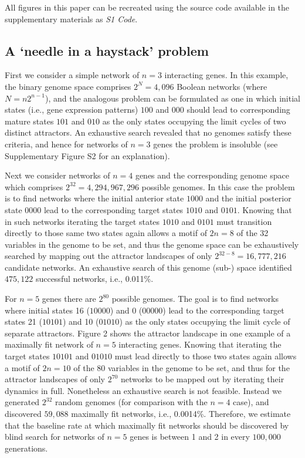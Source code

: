 \documentclass[10pt,letterpaper]{article}
\begin{document}
All figures in this paper can be recreated using the source code available in the supplementary materials as \emph{S1 Code}.

\subsection*{A `needle in a haystack' problem}

First we consider a simple network of $n=3$ interacting genes. In this example, the binary genome space comprises $2^N=4,096$ Boolean networks (where $N=n2^{n-1}$), and the analogous problem can be formulated as one in which initial states (i.e., gene expression patterns) $100$ and $000$ should lead to corresponding mature states $101$ and $010$ as the only states occupying the limit cycles of two distinct attractors. An exhaustive search revealed that no genomes satisfy these criteria, and hence for networks of $n=3$ genes the problem is insoluble (see Supplementary Figure S2 for an explanation).

Next we consider networks of $n=4$ genes and the corresponding genome space which comprises $2^{32}=4,294,967,296$ possible genomes. In this case the problem is to find networks where the initial anterior state $1000$ and the initial posterior state $0000$ lead to the corresponding target states $1010$ and $0101$. Knowing that in such networks iterating the target states $1010$ and $0101$ must transition directly to those same two states again allows a motif of $2n=8$ of the 32 variables in the genome to be set, and thus the genome space can be exhaustively searched by mapping out the attractor landscapes of only $2^{32-8}=16,777,216$ candidate networks. An exhaustive search of this genome (sub-) space identified $475,122$ successful networks, i.e., 0.011\%. 

For $n=5$ genes there are $2^{80}$ possible genomes. The goal is to find networks where initial states 16 ($10000$) and 0 ($00000$) lead to the corresponding target states 21 ($10101$) and 10 ($01010$) as the only states occupying the limit cycle of separate attractors. Figure 2 shows the attractor landscape in one example of a maximally fit network of $n=5$ interacting genes. Knowing that iterating the target states $10101$ and $01010$ must lead directly to those two states again allows a motif of $2n=10$ of the 80 variables in the genome to be set, and thus for the attractor landscapes of only $2^{70}$ networks to be mapped out by iterating their dynamics in full. Nonetheless an exhaustive search is not feasible. Instead we generated $2^{32}$ random genomes (for comparison with the $n=4$ case), and discovered $59,088$ maximally fit networks, i.e., 0.0014\%. Therefore, we estimate that the baseline rate at which maximally fit networks should be discovered by blind search for networks of $n=5$ genes is between 1 and 2 in every $100,000$ generations. 
\end{document}
